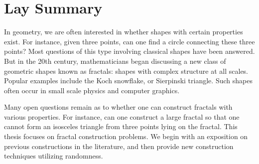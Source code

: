 


\chapter{Lay Summary}



In geometry, we are often interested in whether shapes with certain properties exist. For instance, given three points, can one find a circle connecting these three points? Most questions of this type involving classical shapes have been answered. But in the 20th century, mathematicians began discussing a new class of geometric shapes known as fractals: shapes with complex structure at all scales. Popular examples include the Koch snowflake, or Sierpinski triangle. Such shapes often occur in small scale physics and computer graphics.

Many open questions remain as to whether one can construct fractals with various properties. For instance, can one construct a large fractal so that one cannot form an isosceles triangle from three points lying on the fractal. This thesis focuses on fractal construction problems. We begin with an exposition on previous constructions in the literature, and then provide new construction techniques utilizing randomness.
